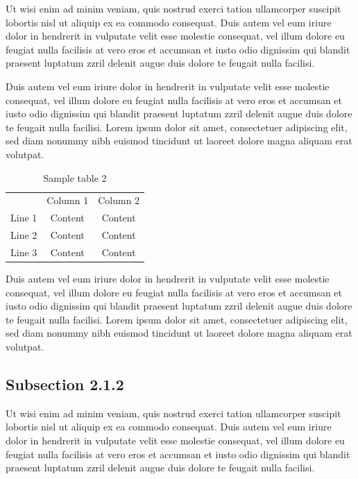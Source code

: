 \documentclass[11pt, a4paper, twoside]{report}
\begin{document}
Ut wisi enim ad minim veniam, quis nostrud exerci tation ullamcorper suscipit lobortis nisl ut aliquip ex ea commodo consequat. Duis autem vel eum iriure dolor in hendrerit in vulputate velit esse molestie consequat, vel illum dolore eu feugiat nulla facilisis at vero eros et accumsan et iusto odio dignissim qui blandit praesent luptatum zzril delenit augue duis dolore te feugait nulla facilisi.

Duis autem vel eum iriure dolor in hendrerit in vulputate velit esse molestie consequat, vel illum dolore eu feugiat nulla facilisis at vero eros et accumsan et iusto odio dignissim qui blandit praesent luptatum zzril delenit augue duis dolore te feugait nulla facilisi. Lorem ipsum dolor sit amet, consectetuer adipiscing elit, sed diam nonummy nibh euismod tincidunt ut laoreet dolore magna aliquam erat volutpat.

\begin{table}[H]
  \centering
  \begin{tabular}{c c@{\hskip 1.5in} c} 
    & Column 1 & Column 2  \\ [0.5ex] 
    Line 1 & Content & Content \\ 
    Line 2 & Content & Content \\
    Line 3 & Content & Content \\ [1ex] 
  \end{tabular}
  \captionsetup{font=bf, belowskip=-0.5cm}
  \caption[Sample table 2]{Sample table 2}
  \label{table:tab_2}
  
\end{table}
Duis autem vel eum iriure dolor in hendrerit in vulputate velit esse molestie consequat, vel illum dolore eu feugiat nulla facilisis at vero eros et accumsan et iusto odio dignissim qui blandit praesent luptatum zzril delenit augue duis dolore te feugait nulla facilisi. Lorem ipsum dolor sit amet, consectetuer adipiscing elit, sed diam nonummy nibh euismod tincidunt ut laoreet dolore magna aliquam erat volutpat.

\subsection{Subsection 2.1.2} \label{sec:subsection_212}

Ut wisi enim ad minim veniam, quis nostrud exerci tation ullamcorper suscipit lobortis nisl ut aliquip ex ea commodo consequat. Duis autem vel eum iriure dolor in hendrerit in vulputate velit esse molestie consequat, vel illum dolore eu feugiat nulla facilisis at vero eros et accumsan et iusto odio dignissim qui blandit praesent luptatum zzril delenit augue duis dolore te feugait nulla facilisi.
\end{document}
